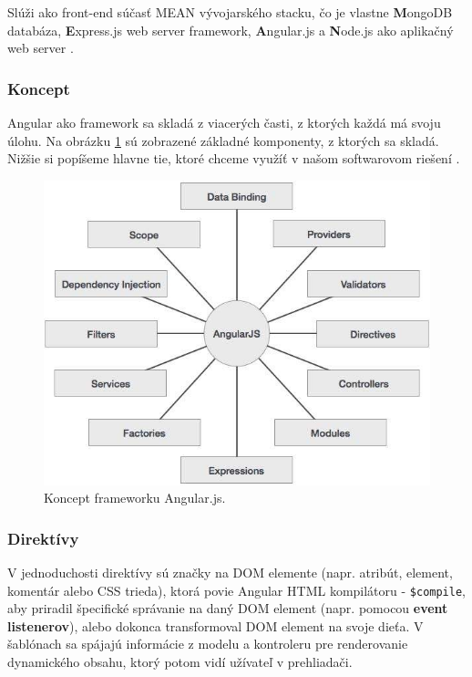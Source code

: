 Slúži ako front-end súčasť MEAN vývojarského stacku, čo je vlastne \textbf{M}ongoDB databáza, \textbf{E}xpress.js web server framework, \textbf{A}ngular.js  a \textbf{N}ode.js ako aplikačný web server \cite{angular-wiki}\cite{angular-docs}.

\subsubsection{Koncept}
Angular ako framework sa skladá z viacerých časti, z ktorých každá má svoju úlohu. Na obrázku \ref{img-angular-concept} sú zobrazené základné komponenty, z ktorých sa skladá. Nižšie si popíšeme hlavne tie, ktoré chceme využíť v našom softwarovom riešení \cite{angular-concept}.

\begin{figure}[H]
  \centering
  \includegraphics[scale=0.5]{img/angular/angularjs_concepts.jpg}
  \caption{Koncept frameworku Angular.js.}
  \label{img-angular-concept}
\end{figure}

\subsubsection{Direktívy}
V jednoduchosti direktívy sú značky na DOM elemente (napr. atribút, element, komentár alebo CSS trieda), ktorá povie Angular HTML kompilátoru - \verb|$compile|, aby priradil špecifické správanie na daný DOM element (napr. pomocou \textbf{event listenerov}), alebo dokonca transformoval DOM element na svoje dieťa. V šablónach sa spájajú informácie z modelu a kontroleru pre renderovanie dynamického obsahu, ktorý potom vidí užívateľ v prehliadači.


